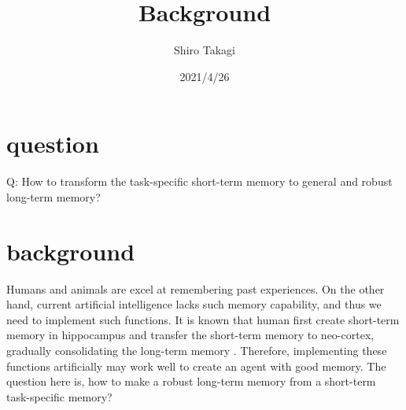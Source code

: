 \documentclass[12pt]{article}
\begin{document}
\title{Background}
\author{Shiro Takagi}
\date{2021/4/26}
\maketitle

\section{question}
Q: How to transform the task-specific short-term memory to general and robust long-term memory?

\section{background}
Humans and animals are excel at remembering past experiences. On the other hand, current artificial intelligence 
lacks such memory capability, and thus we need to implement such functions. It is known that human first create short-term memory 
in hippocampus and transfer the short-term memory to neo-cortex, gradually consolidating the long-term memory 
\cite{Helfer20,Kitamura17,Tonegawa18,Josselyn20}. Therefore, implementing these functions artificially may work well 
to create an agent with good memory. The question here is, how to make a robust long-term memory from a short-term task-specific memory?



\end{document}

